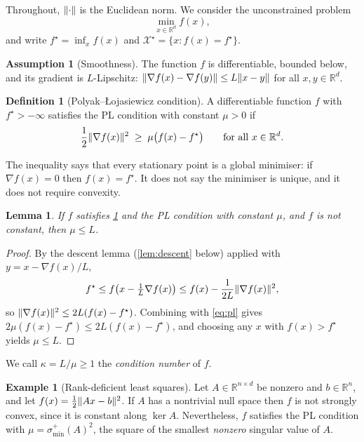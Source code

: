 \documentclass[11pt,a4paper,oneside]{report}
\theoremstyle{plain}
\newtheorem{lemma}[theorem]{Lemma}
\theoremstyle{definition}
\newtheorem{definition}[theorem]{Definition}
\newtheorem{assumption}[theorem]{Assumption}
\newtheorem{example}[theorem]{Example}
\theoremstyle{remark}
\newcommand{\R}{\mathbb{R}}
\newcommand{\X}{\mathcal{X}^\star}
\DeclarePairedDelimiter{\norm}{\lVert}{\rVert}
\begin{document}
Throughout, $\norm{\cdot}$ is the Euclidean norm. We consider the unconstrained problem
\begin{equation}\label{eq:problem}
  \min_{x\in\R^d} f(x),
\end{equation}
and write $f^\star = \inf_x f(x)$ and $\X = \{x : f(x) = f^\star\}$.

\begin{assumption}[Smoothness]\label{ass:smooth}
The function $f$ is differentiable, bounded below, and its gradient is $L$-Lipschitz:
$\norm{\nabla f(x) - \nabla f(y)} \le L\norm{x - y}$ for all $x, y\in\R^d$.
\end{assumption}

\begin{definition}[Polyak--{\L}ojasiewicz condition]\label{def:pl}
A differentiable function $f$ with $f^\star > -\infty$ satisfies the PL condition with constant $\mu > 0$ if
\begin{equation}\label{eq:pl}
  \frac{1}{2}\norm{\nabla f(x)}^2 \;\ge\; \mu\bigl(f(x) - f^\star\bigr) \qquad\text{for all } x\in\R^d.
\end{equation}
\end{definition}

The inequality says that every stationary point is a global minimiser: if $\nabla f(x) = 0$ then $f(x) = f^\star$. It does not say the minimiser is unique, and it does not require convexity.

\begin{lemma}\label{lem:mu-le-L}
If $f$ satisfies \cref{ass:smooth} and the PL condition with constant $\mu$, and $f$ is not constant, then $\mu \le L$.
\end{lemma}

\begin{proof}
By the descent lemma (\cref{lem:descent} below) applied with $y = x - \nabla f(x)/L$,
\[
  f^\star \le f\bigl(x - \tfrac1L\nabla f(x)\bigr) \le f(x) - \frac{1}{2L}\norm{\nabla f(x)}^2,
\]
so $\norm{\nabla f(x)}^2 \le 2L(f(x) - f^\star)$. Combining with \eqref{eq:pl} gives $2\mu(f(x) - f^\star) \le 2L(f(x) - f^\star)$, and choosing any $x$ with $f(x) > f^\star$ yields $\mu\le L$.
\end{proof}

We call $\kappa = L/\mu \ge 1$ the \emph{condition number} of $f$.

\begin{example}[Rank-deficient least squares]\label{ex:least-squares}
Let $A\in\R^{n\times d}$ be nonzero and $b\in\R^n$, and let $f(x) = \frac12\norm{Ax - b}^2$. If $A$ has a nontrivial null space then $f$ is not strongly convex, since it is constant along $\ker A$. Nevertheless, $f$ satisfies the PL condition with $\mu = \sigma_{\min}^{+}(A)^2$, the square of the smallest \emph{nonzero} singular value of $A$.
\end{example}
\end{document}
